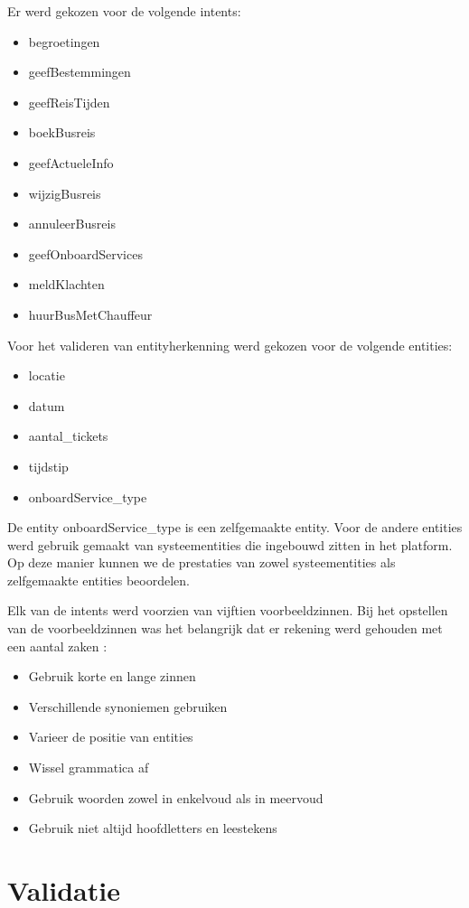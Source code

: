 Er werd gekozen voor de volgende intents:
\begin{itemize}
    \item begroetingen
    \item geefBestemmingen
    \item geefReisTijden
    \item boekBusreis
    \item geefActueleInfo
    \item wijzigBusreis
    \item annuleerBusreis
    \item geefOnboardServices
    \item meldKlachten
    \item huurBusMetChauffeur
\end{itemize}

Voor het valideren van entityherkenning werd gekozen voor de volgende entities:
\begin{itemize}
    \item locatie
    \item datum
    \item aantal\_tickets
    \item tijdstip
    \item onboardService\_type
\end{itemize}

De entity onboardService\_type is een zelfgemaakte entity. Voor de andere entities werd gebruik gemaakt van systeementities die ingebouwd zitten in het platform. Op deze manier kunnen we de prestaties van zowel systeementities als zelfgemaakte entities beoordelen.


Elk van de intents werd voorzien van vijftien voorbeeldzinnen. Bij het opstellen van de voorbeeldzinnen was het belangrijk dat er rekening werd gehouden met een aantal zaken \autocite{Greyling2019}:
\begin{itemize}
    \item Gebruik korte en lange zinnen
    \item Verschillende synoniemen gebruiken
    \item Varieer de positie van entities
    \item Wissel grammatica af
    \item Gebruik woorden zowel in enkelvoud als in meervoud
    \item Gebruik niet altijd hoofdletters en leestekens
\end{itemize}

\section{Validatie}
\label{sec:validatie}

